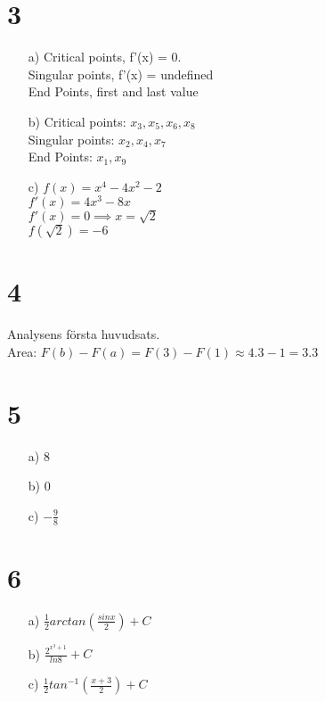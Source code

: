 \documentclass{article}
\begin{document}
\section*{3}
\begin{itemize}
\item[a) ] 	Critical points, f'(x) = 0. \\
			Singular points, f'(x) = undefined \\
			End Points, first and last value \\
			
\item[b) ]	Critical points: 	$x_3, x_5, x_6, x_8$ \\
			Singular points:  	$x_2, x_4, x_7 $ \\
			End Points: 		$x_1, x_9$ \\
			
\item[c) ]	$f(x) = x^4- 4x^2 - 2$ \\
			$f'(x) = 4x^3 - 8x$ \\
			$f'(x) = 0 \implies x = \sqrt{2}$ \\
			$f(\sqrt{2}) = -6$	
\end{itemize}
\section*{4}
Analysens första huvudsats. \\
Area: $F(b) - F(a) = F(3) - F(1) \approx 4.3 - 1 = 3.3$

\section*{5}
\begin{itemize}
    \item[a) ] $8$
    \item[b) ] $0$ 
    \item[c) ] $-\frac{9}{8}$
\end{itemize}

\section*{6}
\begin{itemize}
    \item[a) ] $\frac{1}{2} arctan(\frac{sin x}{2}) + C$
    \item[b) ] $\frac{2^{x^3+1}}{ln 8} + C$ 
    \item[c) ] $\frac{1}{2} tan^{-1} (\frac{x+3}{2}) + C$
\end{itemize}
\end{document}
